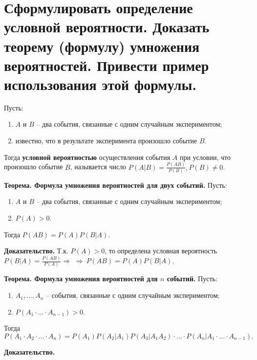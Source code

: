 \section{Сформулировать определение условной вероятности. Доказать теорему (формулу) умножения вероятностей. Привести пример использования этой формулы.}

Пусть:

\begin{enumerate}[label=\arabic*)]
	\item $A$ и $B$ -- два события, связанные с одним случайным экспериментом;
	\item известно, что в результате эксперимента произошло событие $B$.
\end{enumerate}

Тогда \textbf{условной вероятностью} осуществления события $A$ при условии, что произошло событие $B$, называется число $P(A|B) = \frac{P(AB)}{P(B)}, P(B) \neq 0.$

\textbf{Теорема. Формула умножения вероятностей для двух событий.} Пусть: 
\begin{enumerate}[label=\arabic*)]
	\item $A$ и $B$ -- два события, связанные с одним случайным экспериментом;
	\item $P(A) > 0$.
\end{enumerate}
Тогда $P(AB) = P(A)P(B|A).$

\textbf{Доказательство.} Т.к. $P(A) > 0$, то определена условная вероятность $P(B|A) = \frac{P(AB)}{P(A)} \Rightarrow$ $\Rightarrow~P(AB) = P(A)P(B|A).$

\textbf{Теорема. Формула умножения вероятностей для $n$ событий.} Пусть:
\begin{enumerate}[label=\arabic*)]
	\item $A_1,..., A_n$ -- события, связанные с одним случайным экспериментом;
	\item $P(A_1 \cdot ... \cdot A_{n-1}) > 0$.
\end{enumerate}
Тогда $P(A_1 \cdot A_2 \cdot ... \cdot A_n) = P(A_1)P(A_2|A_1)P(A_3|A_1A_2) \cdot ... \cdot P(A_n|A_1 \cdot ... \cdot A_{n-1}).$

\textbf{Доказательство.}

